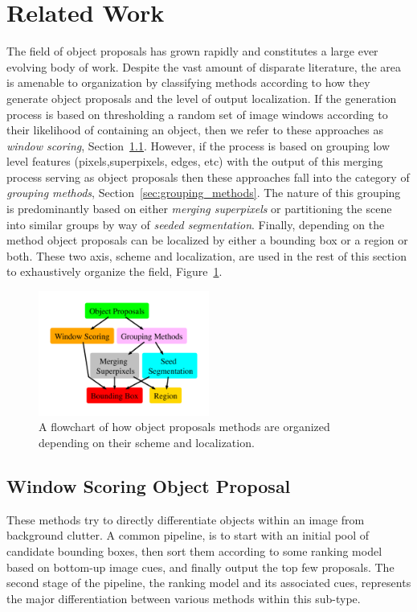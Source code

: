 \section{Related Work}
\label{sec:rw}
The field of object proposals has grown rapidly and constitutes a large ever evolving body of work. Despite the vast amount of disparate literature, the area is amenable to organization by classifying methods according to how they generate object proposals and the level of output localization. If the generation process is based on thresholding a random set of image windows according to their likelihood of containing an object, then we refer to these approaches as \emph{window scoring}, Section~\ref{sec:window_scoring}. However, if the process is based on grouping low level features (pixels,superpixels, edges, etc) with the output of this merging process serving as object proposals then these approaches fall into the category of \emph{grouping methods}, Section~\ref{sec:grouping_methods}. The nature of this grouping is predominantly based on either \emph{merging superpixels} or partitioning the scene into similar groups by way of \emph{seeded segmentation}. Finally, depending on the method object proposals can be localized by either a bounding box or a region or both. These two axis, scheme and localization, are used in the rest of this section to exhaustively organize the field, Figure~\ref{fig:taxonomy}. 

\begin{figure}[ht]
\centering
\includegraphics[width=0.5\textwidth]{figs/taxonomy.pdf}
\caption{A flowchart of how object proposals methods are organized depending on their scheme and localization. }
\label{fig:taxonomy}
\end{figure}

\subsection{Window Scoring Object Proposal}
\label{sec:window_scoring}
These methods try to directly differentiate objects within an image from background clutter. A common pipeline, is to start with an initial pool of candidate bounding boxes, then sort them according to some ranking model based on bottom-up image cues, and finally output the top few proposals. The second stage of the pipeline, the ranking model and its associated cues, represents the major differentiation between various methods within this sub-type.

